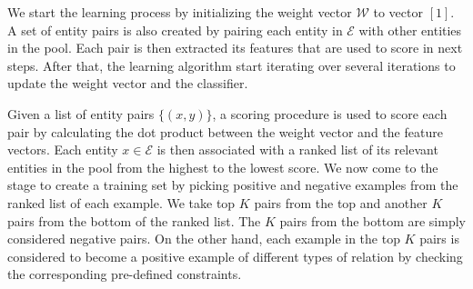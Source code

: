We start the learning process by initializing the weight vector
$\mathcal{W}$ to vector $[1]$. A set of entity pairs is also created
by pairing each entity in $\mathcal{E}$ with other entities in the
pool. Each pair is then extracted its features that are used to score
in next steps. After that, the learning algorithm start iterating
over several iterations to update the weight vector and the
classifier.

Given a list of entity pairs $\{(x,y)\}$, a scoring procedure is used
to score each pair by calculating the dot product between the weight
vector and the feature vectors. Each entity $x \in \mathcal{E}$ is
then associated with a ranked list of its relevant entities in the
pool from the highest to the lowest score. We now come to the stage to
create a training set by picking positive and negative examples from
the ranked list of each example. We take top $K$ pairs from the top
and another $K$ pairs from the bottom of the ranked list. The $K$
pairs from the bottom are simply considered negative pairs. On the
other hand, each example in the top $K$ pairs is considered to become
a positive example of different types of relation by checking the
corresponding pre-defined constraints.

